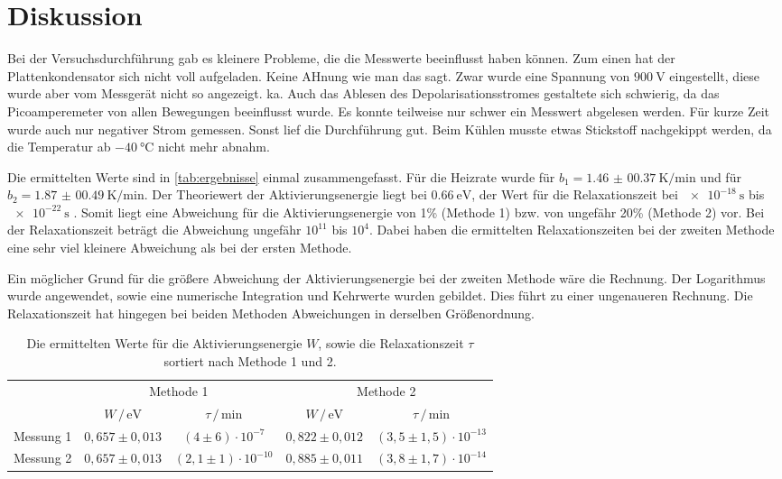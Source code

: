 \section{Diskussion}
\label{sec:Diskussion}

Bei der Versuchsdurchführung gab es kleinere Probleme, die die Messwerte beeinflusst haben können.
Zum einen hat der Plattenkondensator sich nicht voll aufgeladen. Keine AHnung wie man das sagt.
Zwar wurde eine Spannung von $\SI{900}{\volt}$ eingestellt, diese wurde aber vom Messgerät nicht so angezeigt. ka.
Auch das Ablesen des Depolarisationsstromes gestaltete sich schwierig, da das Picoamperemeter von allen Bewegungen beeinflusst wurde.
Es konnte teilweise nur schwer ein Messwert abgelesen werden.
Für kurze Zeit wurde auch nur negativer Strom gemessen.
Sonst lief die Durchführung gut.
Beim Kühlen musste etwas Stickstoff nachgekippt werden, da die Temperatur ab $\SI{-40}{\celsius}$ nicht mehr abnahm.

\noindent
Die ermittelten Werte sind in \autoref{tab:ergebnisse} einmal zusammengefasst.
Für die Heizrate wurde für $b_1 = \SI{1.46(0037)}{\kelvin\per\minute}$ und für $b_2 = \SI{1.87(0049)}{\kelvin\per\minute}$.
Der Theoriewert der Aktivierungsenergie liegt bei $\SI{0.66}{\electronvolt}$, der Wert für die Relaxationszeit bei $\SI{e-18}{\second}$ bis $\SI{e-22}{\second}$ \cite{muccillo}.
Somit liegt eine Abweichung für die Aktivierungsenergie von 1\% (Methode 1) bzw. von ungefähr 20\% (Methode 2) vor.
Bei der Relaxationszeit beträgt die Abweichung ungefähr $10^{11}$ bis $10^{4}$.
Dabei haben die ermittelten Relaxationszeiten bei der zweiten Methode eine sehr viel kleinere Abweichung als bei der ersten Methode.

\noindent
Ein möglicher Grund für die größere Abweichung der Aktivierungsenergie bei der zweiten Methode wäre die Rechnung.
Der Logarithmus wurde angewendet, sowie eine numerische Integration und Kehrwerte wurden gebildet.
Dies führt zu einer ungenaueren Rechnung.
Die Relaxationszeit hat hingegen bei beiden Methoden Abweichungen in derselben Größenordnung.

\begin{table}[h]
    \centering
    \caption{Die ermittelten Werte für die Aktivierungsenergie $W$, sowie die Relaxationszeit $\tau$ sortiert nach Methode 1 und 2.}
    \label{tab:ergebnisse}
    \begin{tabular}{c c c c c}
      \toprule
      &\multicolumn{2}{c}{Methode 1} &\multicolumn{2}{c}{Methode 2}\\
      \cmidrule(lr){2-3}\cmidrule(lr){4-5}
                   &$W \, / \, \si{\electronvolt}$  &$\tau \, / \, \si{\minute}$ & $W \, / \, \si{\electronvolt}$    & $\tau \, / \, \si{\minute}$   \\
      \midrule
      Messung 1    & $0,657 \pm 0,013$              & $(4\pm 6)\cdot 10^{-7}$    & $0,822 \pm 0,012$                 & $(3,5\pm 1,5)\cdot 10^{-13}$  \\   
      Messung 2    & $0,657 \pm 0,013$              & $(2,1\pm 1)\cdot 10^{-10}$ & $0,885 \pm 0,011$                 & $(3,8\pm 1,7)\cdot 10^{-14}$  \\   
      \bottomrule
    \end{tabular}
  \end{table}

